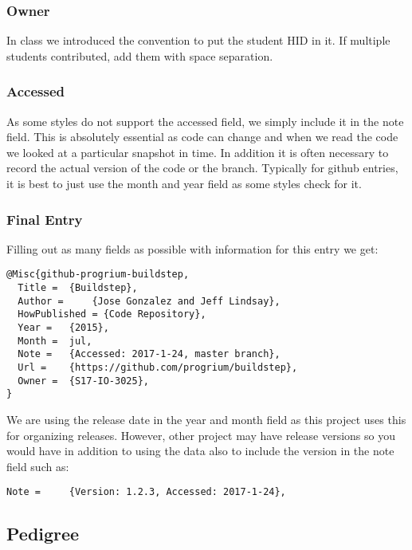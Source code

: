 \subsubsection{Owner}\label{s:e:owner}

In class we introduced the convention to put the student HID in it. If
multiple students contributed, add them with space separation.

\subsubsection{Accessed}\label{s:e:accessed}

As some styles do not support the accessed field, we simply include it in
the note field. This is absolutely essential as code can change and when
we read the code we looked at a particular snapshot in time. In addition
it is often necessary to record the actual version of the code or the branch.
Typically for github entries, it is best to just use the month and
year field as some styles check for it.

\subsubsection{Final Entry}

Filling out as many fields as possible with information for this entry
we get:

\begin{verbatim}
@Misc{github-progrium-buildstep,
  Title =  {Buildstep},
  Author =     {Jose Gonzalez and Jeff Lindsay},
  HowPublished = {Code Repository},
  Year =   {2015},
  Month =  jul,
  Note =   {Accessed: 2017-1-24, master branch},
  Url =    {https://github.com/progrium/buildstep},
  Owner =  {S17-IO-3025},
}
\end{verbatim}

We are using the release date in the year and month field as this
project uses this for organizing releases. However, other project may
have release versions so you would have in addition to using the data
also to include the version in the note field such as:

\begin{verbatim}
Note =     {Version: 1.2.3, Accessed: 2017-1-24},
\end{verbatim}


\subsection{Pedigree}

